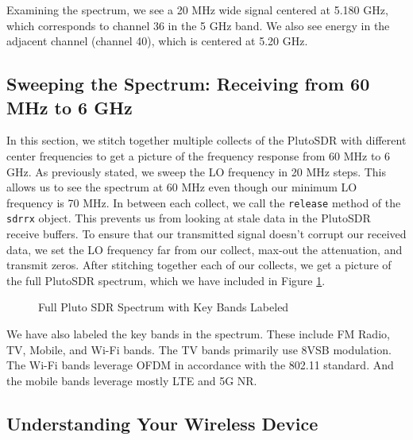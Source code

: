 \documentclass{article}
\begin{document}
Examining the spectrum, we see a 20 MHz wide signal centered at 5.180 GHz, which corresponds to channel 36 in the 5 GHz band. We also see energy in the adjacent channel (channel 40), which is centered at 5.20 GHz.

\subsection{Sweeping the Spectrum: Receiving from 60 MHz to 6 GHz}

In this section, we stitch together multiple collects of the PlutoSDR with different center frequencies to get a picture of the frequency response from 60 MHz to 6 GHz. As previously stated, we sweep the LO frequency in 20 MHz steps. This allows us to see the spectrum at 60 MHz even though our minimum LO frequency is 70 MHz. In between each collect, we call the \texttt{release} method of the \texttt{sdrrx} object. This prevents us from looking at stale data in the PlutoSDR receive buffers. To ensure that our transmitted signal doesn't corrupt our received data, we set the LO frequency far from our collect, max-out the attenuation, and transmit zeros. After stitching together each of our collects, we get a picture of the full PlutoSDR spectrum, which we have included in Figure \ref{fig::full_spectrum_labeled}.

\begin{figure}[H]
	\centerline{}
	\caption{Full Pluto SDR Spectrum with Key Bands Labeled}
	\label{fig::full_spectrum_labeled}
\end{figure}

We have also labeled the key bands in the spectrum. These include FM Radio, TV, Mobile, and Wi-Fi bands. The TV bands primarily use 8VSB modulation. The Wi-Fi bands leverage OFDM in accordance with the 802.11 standard. And the mobile bands leverage mostly LTE and 5G NR.

\subsection{Understanding Your Wireless Device}
\end{document}
